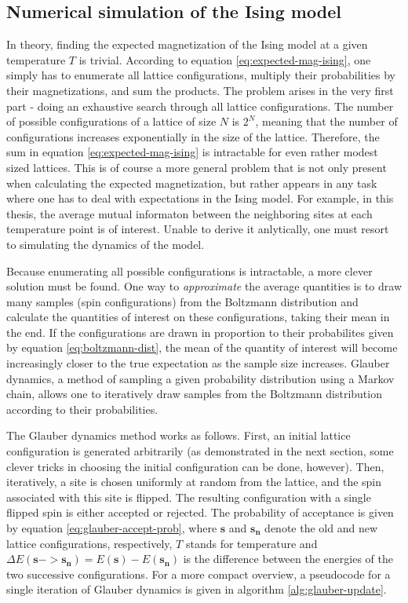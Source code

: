 \documentclass[12pt]{article}
\begin{document}
\subsection{Numerical simulation of the Ising model}

In theory, finding the expected magnetization of the Ising model at a given temperature $T$ is trivial. According to equation \ref{eq:expected-mag-ising}, one simply has to enumerate all lattice configurations, multiply their probabilities by their magnetizations, and sum the products. The problem arises in the very first part - doing an exhaustive search through all lattice configurations. The number of possible configurations of a lattice of size $N$ is $2^N$, meaning that the number of configurations increases exponentially in the size of the lattice. Therefore, the sum in equation \ref{eq:expected-mag-ising} is intractable for even rather modest sized lattices. This is of course a more general problem that is not only present when calculating the expected magnetization, but rather appears in any task where one has to deal with expectations in the Ising model. For example, in this thesis, 
the average mutual informaton between the neighboring sites at each temperature point is of interest. Unable to derive it anlytically, one must resort to simulating the dynamics of the model. 

Because enumerating all possible configurations is intractable, a more clever solution must be found. One way to \textit{approximate} the average quantities is to draw many samples (spin configurations) from the Boltzmann distribution and calculate the quantities of interest on these configurations, taking their mean in the end. If the configurations are drawn in proportion to their probabilites given by equation \ref{eq:boltzmann-dist}, the mean of the quantity of interest will become increasingly closer to the true expectation as the sample size increases. Glauber dynamics, a method of sampling a given probability distribution using a Markov chain, allows one to iteratively draw samples from the Boltzmann distribution according to their probabilities.

The Glauber dynamics method works as follows. First, an initial lattice configuration is generated arbitrarily (as demonstrated in the next section, some clever tricks in choosing the initial configuration can be done, however). Then, iteratively, a site is chosen uniformly at random from the lattice, and the spin associated with this site is flipped. The resulting configuration with a single flipped spin is either accepted or rejected. The probability of acceptance is given by equation \ref{eq:glauber-accept-prob}, where $\boldsymbol{s}$ and $\boldsymbol{s_n}$ denote the old and new lattice configurations, respectively, $T$ stands for temperature and $\Delta E(\boldsymbol{s} -> \boldsymbol{s_n}) = E(\boldsymbol{s}) - E(\boldsymbol{s_n})$ is the difference between the energies of the two successive configurations. For a more compact overview, a pseudocode for a single iteration of Glauber dynamics is given in algorithm \ref{alg:glauber-update}.
\end{document}

